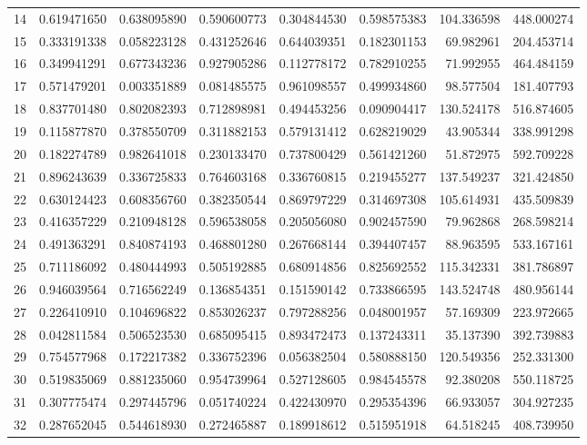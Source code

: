 \begin{longtable}{rrrrrrrr}
14 & 0.619471650 & 0.638095890 & 0.590600773 & 0.304844530 & 0.598575383 & 104.336598 & 448.000274 \\
15 & 0.333191338 & 0.058223128 & 0.431252646 & 0.644039351 & 0.182301153 & 69.982961 & 204.453714 \\
16 & 0.349941291 & 0.677343236 & 0.927905286 & 0.112778172 & 0.782910255 & 71.992955 & 464.484159 \\
17 & 0.571479201 & 0.003351889 & 0.081485575 & 0.961098557 & 0.499934860 & 98.577504 & 181.407793 \\
18 & 0.837701480 & 0.802082393 & 0.712898981 & 0.494453256 & 0.090904417 & 130.524178 & 516.874605 \\
19 & 0.115877870 & 0.378550709 & 0.311882153 & 0.579131412 & 0.628219029 & 43.905344 & 338.991298 \\
20 & 0.182274789 & 0.982641018 & 0.230133470 & 0.737800429 & 0.561421260 & 51.872975 & 592.709228 \\
21 & 0.896243639 & 0.336725833 & 0.764603168 & 0.336760815 & 0.219455277 & 137.549237 & 321.424850 \\
22 & 0.630124423 & 0.608356760 & 0.382350544 & 0.869797229 & 0.314697308 & 105.614931 & 435.509839 \\
23 & 0.416357229 & 0.210948128 & 0.596538058 & 0.205056080 & 0.902457590 & 79.962868 & 268.598214 \\
24 & 0.491363291 & 0.840874193 & 0.468801280 & 0.267668144 & 0.394407457 & 88.963595 & 533.167161 \\
25 & 0.711186092 & 0.480444993 & 0.505192885 & 0.680914856 & 0.825692552 & 115.342331 & 381.786897 \\
26 & 0.946039564 & 0.716562249 & 0.136854351 & 0.151590142 & 0.733866595 & 143.524748 & 480.956144 \\
27 & 0.226410910 & 0.104696822 & 0.853026237 & 0.797288256 & 0.048001957 & 57.169309 & 223.972665 \\
28 & 0.042811584 & 0.506523530 & 0.685095415 & 0.893472473 & 0.137243311 & 35.137390 & 392.739883 \\
29 & 0.754577968 & 0.172217382 & 0.336752396 & 0.056382504 & 0.580888150 & 120.549356 & 252.331300 \\
30 & 0.519835069 & 0.881235060 & 0.954739964 & 0.527128605 & 0.984545578 & 92.380208 & 550.118725 \\
31 & 0.307775474 & 0.297445796 & 0.051740224 & 0.422430970 & 0.295354396 & 66.933057 & 304.927235 \\
32 & 0.287652045 & 0.544618930 & 0.272465887 & 0.189918612 & 0.515951918 & 64.518245 & 408.739950 \\

\end{longtable}
